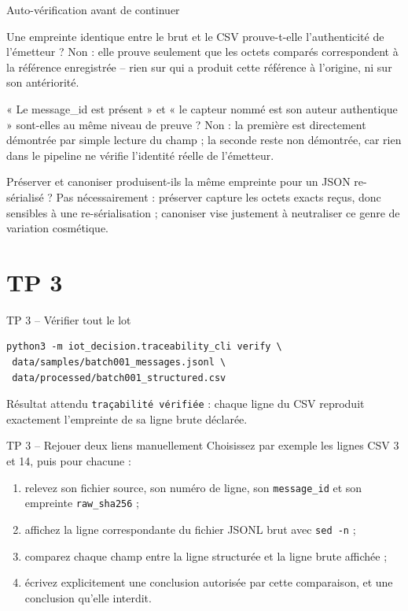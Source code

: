 \documentclass[aspectratio=169]{beamer}
\begin{document}
\begin{frame}{Auto-vérification avant de continuer}
\small
\begin{block}{Une empreinte identique entre le brut et le CSV prouve-t-elle l'authenticité de l'émetteur ?}
Non : elle prouve seulement que les octets comparés correspondent à la référence enregistrée -- rien sur qui a produit cette référence à l'origine, ni sur son antériorité.
\end{block}
\begin{block}{« Le message\_id est présent » et « le capteur nommé est son auteur authentique » sont-elles au même niveau de preuve ?}
Non : la première est directement démontrée par simple lecture du champ ; la seconde reste non démontrée, car rien dans le pipeline ne vérifie l'identité réelle de l'émetteur.
\end{block}
\begin{block}{Préserver et canoniser produisent-ils la même empreinte pour un JSON re-sérialisé ?}
Pas nécessairement : préserver capture les octets exacts reçus, donc sensibles à une re-sérialisation ; canoniser vise justement à neutraliser ce genre de variation cosmétique.
\end{block}
\end{frame}

\section{TP 3}
\begin{frame}[fragile]{TP 3 -- Vérifier tout le lot}
\small
\begin{verbatim}
python3 -m iot_decision.traceability_cli verify \
 data/samples/batch001_messages.jsonl \
 data/processed/batch001_structured.csv
\end{verbatim}
\begin{block}{Résultat attendu}
\texttt{traçabilité vérifiée} : chaque ligne du CSV reproduit exactement l'empreinte de sa ligne brute déclarée.
\end{block}
\end{frame}

\begin{frame}{TP 3 -- Rejouer deux liens manuellement}
Choisissez par exemple les lignes CSV 3 et 14, puis pour chacune :
\begin{enumerate}
\item relevez son fichier source, son numéro de ligne, son \texttt{message\_id} et son empreinte \texttt{raw\_sha256} ;
\item affichez la ligne correspondante du fichier JSONL brut avec \texttt{sed -n} ;
\item comparez chaque champ entre la ligne structurée et la ligne brute affichée ;
\item écrivez explicitement une conclusion autorisée par cette comparaison, et une conclusion qu'elle interdit.
\end{enumerate}
\end{frame}
\end{document}
